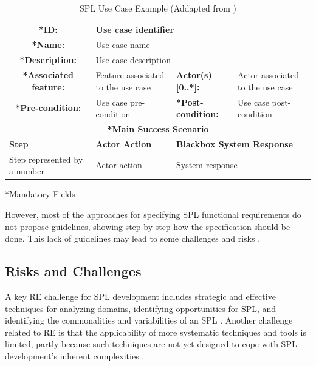 \begin{table}[]
\centering
\scriptsize
\caption{SPL Use Case Example (Addapted from \citep{de2014defining})}
\label{table:use-case}
\begin{tabular}{|l|l|l|l|}
\hline
\multicolumn{1}{|c|}{\textbf{*ID:}} & \multicolumn{3}{l|}{Use case identifier} \\ \hline 

\multicolumn{1}{|c|}{\textbf{*Name:}} & \multicolumn{3}{l|}{Use case name} \\ \hline 

\multicolumn{1}{|c|}{\textbf{*Description:}} & \multicolumn{3}{l|}{Use case description} \\ \hline 

\multicolumn{1}{|c|}{\textbf{*Associated feature:}} & Feature associated to the
use case & \textbf{Actor(s) [0..*]:} & Actor associated to the use case \\ \hline

\multicolumn{1}{|c|}{\textbf{*Pre-condition:}} & Use case pre-condition &
\textbf{*Post-condition:} & Use case post-condition \\ \hline

\multicolumn{4}{|c|}{\textbf{*Main Success Scenario}} 
\\ \hline

\multicolumn{1}{|l|}{\textbf{Step}} & \multicolumn{1}{|l|}{\textbf{Actor
Action}} & \multicolumn{2}{|l|}{\textbf{Blackbox System Response}} \\ \hline 

\multicolumn{1}{|l|}{Step represented by a number} & \multicolumn{1}{|l|}{Actor
action} & \multicolumn{2}{|l|}{System response} \\ \hline
\end{tabular}
*Mandatory Fields
\end{table}

However, most of the approaches for specifying \ac{SPL} functional requirements
do not propose guidelines, showing step by step how the specification should be
done. This lack of guidelines may lead to some challenges and risks \citep{de2014defining}.

\subsection{Risks and Challenges}

A key \ac{RE} challenge for \ac{SPL} development includes strategic and
effective techniques for analyzing domains, identifying opportunities for \ac{SPL}, and identifying 
the commonalities and variabilities of an \ac{SPL} \citep{cheng2007research}. Another challenge 
related to \ac{RE} is that the applicability of more systematic techniques and tools is limited, 
partly because such techniques are not yet designed to cope with \ac{SPL} development’s inherent 
complexities \citep{birk2003report}.

